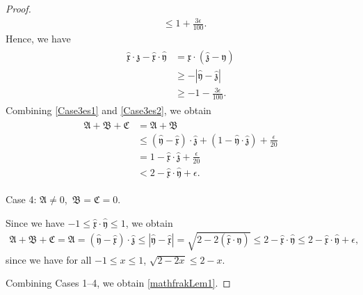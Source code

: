 \documentclass[10pt,a4paper]{amsart}
\numberwithin{equation}{section}
\begin{document}
\begin{proof}
\begin{align*}
&\leq
1+\frac{3\epsilon}{100}.
\end{align*}
Hence, we have
\begin{align}\label{Case3es2}
\begin{aligned}
\hat{\mathfrak{x}}\cdot\hat{\mathfrak{z}}
-\hat{\mathfrak{x}}\cdot\hat{\mathfrak{y}}
&=
\mathfrak{x}\cdot
\left(\hat{\mathfrak{z}}-\hat{\mathfrak{y}}\right)
\\
&\geq
-\left|\hat{\mathfrak{y}}-\hat{\mathfrak{z}}\right|
\\
&\geq
-1-\frac{3\epsilon}{100}.
\end{aligned}
\end{align}
Combining \eqref{Case3es1} and \eqref{Case3es2}, we obtain
\begin{align}\label{mathfrakCase3}
\begin{aligned}
\mathfrak{A}+\mathfrak{B}+\mathfrak{C}
&=
\mathfrak{A}+\mathfrak{B}
\\
&\leq
\left(\hat{\mathfrak{y}}-\hat{\mathfrak{x}}\right)
\cdot\hat{\mathfrak{z}}
+
\left(1-\hat{\mathfrak{y}}\cdot\hat{\mathfrak{z}}\right)
+\frac{\epsilon}{20}
\\
&=
1-\hat{\mathfrak{x}}\cdot\hat{\mathfrak{z}}
+\frac{\epsilon}{20}
\\
&<
2-\hat{\mathfrak{x}}\cdot\hat{\mathfrak{y}}
+\epsilon.
\end{aligned}
\end{align}


Case 4: $\mathfrak{A}\neq 0$,\ $\mathfrak{B}=\mathfrak{C}=0$.

Since we have $-1\leq \hat{\mathfrak{x}}\cdot \hat{\mathfrak{y}}\leq 1$, we obtain
\begin{align}\label{mathfrakCase4}
\mathfrak{A}+\mathfrak{B}+\mathfrak{C}=\mathfrak{A}=\left(\hat{\mathfrak{y}}-\hat{\mathfrak{x}}\right)\cdot \hat{\mathfrak{z}}\leq \left|\hat{\mathfrak{y}}-\hat{\mathfrak{x}}\right|=\sqrt{2-2\left(\hat{\mathfrak{x}}\cdot \hat{\mathfrak{y}}\right)}\leq 2-\hat{\mathfrak{x}}\cdot \hat{\mathfrak{y}}\leq 2-\hat{\mathfrak{x}}\cdot \hat{\mathfrak{y}}+\epsilon,
\end{align}
since we have for all $-1\leq x\leq 1$, $\sqrt{2-2x}\leq 2-x$.


Combining Cases 1--4, we obtain \eqref{mathfrakLem1}.
\end{proof}
\end{document}
